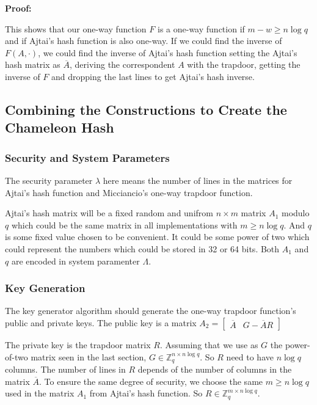 \documentclass[a4paper]{article}
\begin{document}
 \textbf{Proof: }
 
 This shows that our one-way function $F$ is a one-way function if $m-w \geq n \log q$ and if Ajtai's hash function is also one-way. If we could find the inverse of $F(A, \cdot)$, we could find the inverse of Ajtai's hash function setting the Ajtai's hash matrix as $\overline{A}$, deriving the correspondent $A$ with the trapdoor, getting the inverse of $F$ and dropping the last lines to get Ajtai's hash inverse.
 
\subsection{Combining the Constructions to Create the Chameleon Hash}

\subsubsection{Security and System Parameters}

The security parameter $\lambda$ here means the number of lines in the matrices for Ajtai's hash function and Micciancio's one-way trapdoor function.

Ajtai's hash matrix will be a fixed random and unifrom $n \times m$ matrix $A_1$ modulo $q$ which could be the same matrix in all implementations with $m \geq n \log q$. And $q$ is some fixed value chosen to be convenient. It could be some power of two which could represent the numbers which could be stored in 32 or 64 bits. Both $A_1$ and $q$ are encoded in system paramenter $\Lambda$.

\subsubsection{Key Generation}

The key generator algorithm should generate the one-way trapdoor function's public and private keys. The public key is a matrix $A_2=\begin{bmatrix}\overline{A} & G-\overline{A}R\end{bmatrix}$

The private key is the trapdoor matrix $R$. Assuming that we use as $G$ the power-of-two matrix seen in the last section, $G \in \mathbb{Z}_q^{n \times n \log q}$. So $R$ need to have $n \log q$ columns. The number of lines in $R$ depends of the number of columns in the matrix $\overline{A}$. To ensure the same degree of security, we choose the same $m \geq n \log q$ used in the matrix $A_1$ from Ajtai's hash function. So $R\in \mathbb{Z}_q^{m \times n \log q}$.
\end{document}
